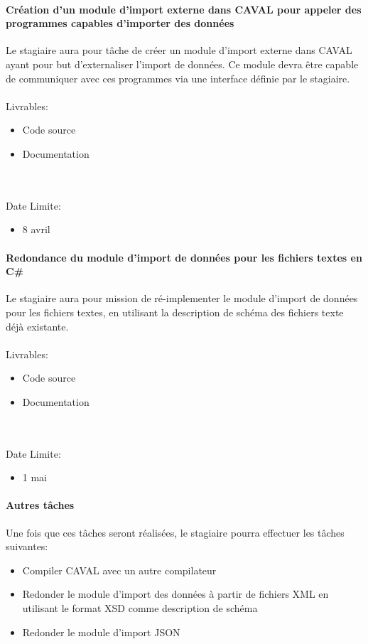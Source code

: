 \documentclass[init,francais]{rapportPFE}  %
\begin{document}
\paragraph*{Création d'un module d'import externe dans CAVAL pour appeler des programmes capables d'importer des données}


Le stagiaire aura pour tâche de créer un module d'import externe dans CAVAL ayant pour but d'externaliser l'import de données. Ce module devra être capable de communiquer avec ces programmes via une interface définie par le stagiaire.
\\~\\
Livrables:
\begin{itemize}
  \item Code source
  \item Documentation
\end{itemize}\\~\\
Date Limite:
\begin{itemize}
  \item 8 avril
\end{itemize}

\paragraph*{Redondance du module d'import de données pour les fichiers textes en C\#}


Le stagiaire aura pour mission de ré-implementer le module d'import de données pour les fichiers textes, en utilisant la description de schéma des fichiers texte déjà existante.
\\~\\
Livrables:
\begin{itemize}
  \item Code source
  \item Documentation
\end{itemize}\\~\\
Date Limite:
\begin{itemize}
  \item 1 mai
\end{itemize}


\paragraph*{Autres tâches}

Une fois que ces tâches seront réalisées, le stagiaire pourra effectuer les tâches suivantes:
\begin{itemize}
  \item Compiler CAVAL avec un autre compilateur
  \item Redonder le module d'import des données à partir de fichiers XML en utilisant le format XSD comme description de schéma
  \item Redonder le module d'import JSON
\end{itemize}
\end{document}
